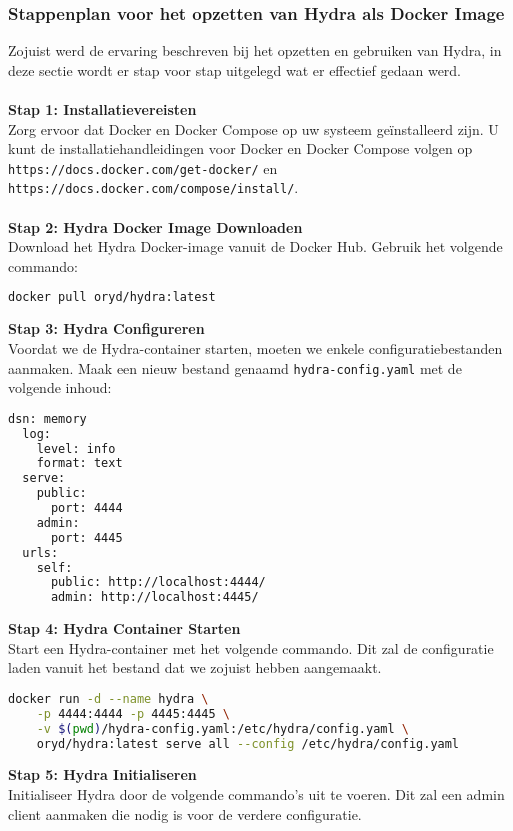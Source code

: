 \subsubsection{Stappenplan voor het opzetten van Hydra als Docker Image}%
\label{subsubsec:hydra-setup}
Zojuist werd de ervaring beschreven bij het opzetten en gebruiken van Hydra, in deze sectie wordt er stap voor stap uitgelegd wat er effectief gedaan werd.\\\\
\textbf{Stap 1: Installatievereisten}\\
Zorg ervoor dat Docker en Docker Compose op uw systeem geïnstalleerd zijn. U kunt de installatiehandleidingen voor Docker en Docker Compose volgen op\\ \texttt{https://docs.docker.com/get-docker/} en \texttt{https://docs.docker.com/compose/install/}.\\\\
\textbf{Stap 2: Hydra Docker Image Downloaden}\\
Download het Hydra Docker-image vanuit de Docker Hub. Gebruik het volgende commando:
\begin{lstlisting}[language=bash]
  docker pull oryd/hydra:latest
\end{lstlisting}
\textbf{Stap 3: Hydra Configureren}\\
Voordat we de Hydra-container starten, moeten we enkele configuratiebestanden aanmaken. Maak een nieuw bestand genaamd \texttt{hydra-config.yaml} met de volgende inhoud:
\begin{lstlisting}[language=bash]
  dsn: memory
  log:
    level: info
    format: text
  serve:
    public:
      port: 4444
    admin:
      port: 4445
  urls:
    self:
      public: http://localhost:4444/
      admin: http://localhost:4445/
\end{lstlisting}
\textbf{Stap 4: Hydra Container Starten}\\
Start een Hydra-container met het volgende commando. Dit zal de configuratie laden vanuit het bestand dat we zojuist hebben aangemaakt.
\begin{lstlisting}[language=bash]
docker run -d --name hydra \
    -p 4444:4444 -p 4445:4445 \
    -v $(pwd)/hydra-config.yaml:/etc/hydra/config.yaml \
    oryd/hydra:latest serve all --config /etc/hydra/config.yaml
\end{lstlisting}
\textbf{Stap 5: Hydra Initialiseren}\\
Initialiseer Hydra door de volgende commando's uit te voeren. Dit zal een admin client aanmaken die nodig is voor de verdere configuratie.
